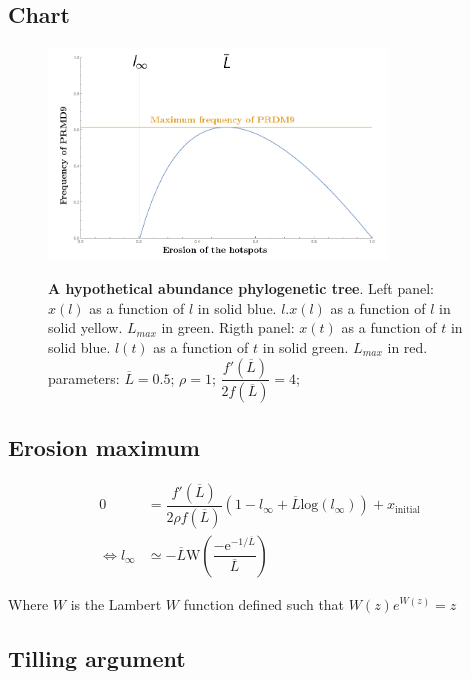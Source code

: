 \documentclass{article}
\begin{document}
\subsection{Chart}
	\begin{figure}[H]
	  \centering
       \includegraphics[width=9.0cm]{Images/single-allele.png}\\
		\caption{ \textbf{A hypothetical abundance phylogenetic tree}. 
		\label{fig:singleallele}
		Left panel:  
$x(l)$ as a function of $l$ in solid blue.   
$l.x(l)$ as a function of $l$ in solid yellow.  
$L_{max}$ in green. 
Rigth panel:  
$x(t)$ as a function of $t$ in solid blue.   
$l(t)$ as a function of $t$ in solid green.  
$L_{max}$ in red. 
parameters: $\overline{L} = 0.5$; $\rho = 1$; $\dfrac{f'(\overline{L})}{2 f(\overline{L})} = 4$;}
	\end{figure}
\subsection{Erosion maximum}

\begin{equation}
  \begin{aligned}
    0 &=\dfrac{f'(\overline{L})}{2 \rho f(\overline{L})} (1-l_{\infty} + \overline{L} \mathrm{log}(l_{\infty})) + x_{\mathrm{initial}}\\
       \iff   l_{\infty} &\simeq - \overline{L} \mathrm{W} \left(\dfrac{ - \mathrm{e}^{- 1 / \overline{L}}}{\overline{L}}  \right)
  \end{aligned}
\end{equation}

Where $W$ is the Lambert $W$ function defined such that $W(z)e^{W(z)}=z$
\subsection{Tilling argument}
\end{document}
